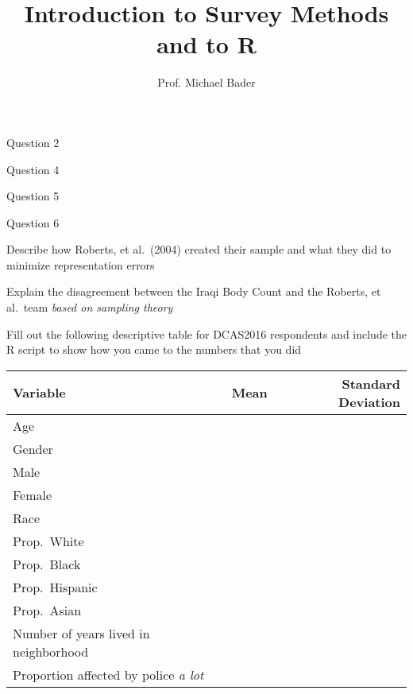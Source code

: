 \documentclass[11pt]{homework}
\title{Introduction to Survey Methods and to R}
\author{Prof. Michael Bader}
\begin{document}
\maketitle 

\begin{questions}

\question Question 2

\question Question 4

\question Question 5

\question Question 6


\question  Describe how Roberts, et al.\ (2004) created their sample and what they did to minimize representation errors

\question Explain the disagreement between the Iraqi Body Count and the Roberts, et al.\ team \emph{based on sampling theory}


\question Fill out the following descriptive table for DCAS2016 respondents and include the R script to show how you came to the numbers that you did\\[1em]

\begin{tabular}{lrr}
\textbf{Variable} & \textbf{Mean} & \textbf{Standard Deviation}\\ \toprule
Age & & \\
Gender & & \\
\quad Male & & \\
\quad Female & & \\
Race & & \\
\quad Prop.\ White & & \\
\quad Prop.\ Black & & \\
\quad Prop.\ Hispanic & & \\
\quad Prop.\ Asian \\
Number of years lived in neighborhood & & \\
Proportion affected by police \emph{a lot} & & \\\bottomrule


\end{tabular}


\end{questions}
\end{document}
